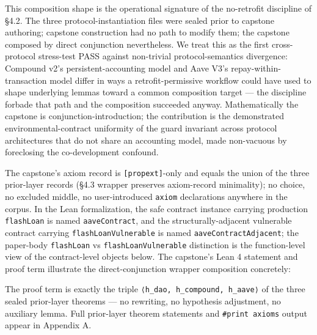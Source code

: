 This composition shape is the operational signature of the no-retrofit
discipline of §4.2. The three protocol-instantiation files were sealed
prior to capstone authoring; capstone construction had no path to modify
them; the capstone composed by direct conjunction nevertheless. We treat
this as the first cross-protocol stress-test PASS against non-trivial
protocol-semantics divergence: Compound v2's persistent-accounting model
and Aave V3's repay-within-transaction model differ in ways a
retrofit-permissive workflow could have used to shape underlying lemmas
toward a common composition target --- the discipline forbade that path
and the composition succeeded anyway. Mathematically the capstone is
conjunction-introduction; the contribution is the demonstrated
environmental-contract uniformity of the guard invariant across protocol
architectures that do not share an accounting model, made non-vacuous by
foreclosing the co-development confound.

The capstone's axiom record is \texttt{{[}propext{]}}-only and equals
the union of the three prior-layer records (§4.3 wrapper preserves
axiom-record minimality); no choice, no excluded middle, no
user-introduced \texttt{axiom} declarations anywhere in the corpus. In
the Lean formalization, the safe contract instance carrying production
\texttt{flashLoan} is named \texttt{aaveContract}, and the
structurally-adjacent vulnerable contract carrying
\texttt{flashLoanVulnerable} is named \texttt{aaveContractAdjacent}; the
paper-body \texttt{flashLoan} vs \texttt{flashLoanVulnerable}
distinction is the function-level view of the contract-level objects
below. The capstone's Lean 4 statement and proof term illustrate the
direct-conjunction wrapper composition concretely:

\begin{Shaded}
\begin{Highlighting}[]
\end{Highlighting}
\end{Shaded}

The proof term is exactly the triple
\texttt{⟨h\_dao,\ h\_compound,\ h\_aave⟩} of the three sealed
prior-layer theorems --- no rewriting, no hypothesis adjustment, no
auxiliary lemma. Full prior-layer theorem statements and
\texttt{\#print\ axioms} output appear in Appendix A.

